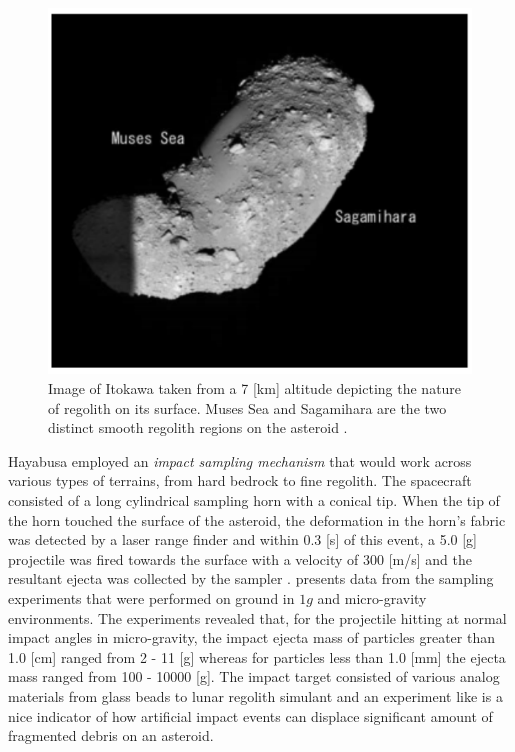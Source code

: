 \begin{figure}[htb]
\centering
\captionsetup{justification=centering}
\includegraphics[width=\linewidth, height=0.4\textheight, keepaspectratio=true]{itokawa_regolith.pdf}
\caption{Image of Itokawa taken from a 7 [km] altitude depicting the nature of regolith on its surface. Muses Sea and Sagamihara are the two distinct smooth regolith regions on the asteroid \parencite{fujiwara2006ItokawaHayabusa}.}
\label{fig:itokawa_regolith}
\end{figure}
\FloatBarrier
Hayabusa employed an \textit{impact sampling mechanism} that would work across various types of terrains, from hard bedrock to fine regolith. The spacecraft consisted of a long cylindrical sampling horn with a conical tip. When the tip of the horn touched the surface of the asteroid, the deformation in the horn's fabric was detected by a laser range finder and within 0.3 [s] of this event, a 5.0 [g] projectile was fired towards the surface with a velocity of 300 [m/s] and the resultant ejecta was collected by the sampler \parencite{yano2004sampling}. \cite{yanoHayabusaTouchdown} presents data from the sampling experiments that were performed on ground in $1g$ and micro-gravity environments. The experiments revealed that, for the projectile hitting at normal impact angles in micro-gravity, the impact ejecta mass of particles greater than 1.0 [cm] ranged from 2 - 11 [g] whereas for particles less than 1.0 [mm] the ejecta mass ranged from 100 - 10000 [g]. The impact target consisted of various analog materials from glass beads to lunar regolith simulant and an experiment like is a nice indicator of how artificial impact events can displace significant amount of fragmented debris on an asteroid.

